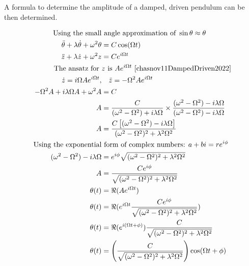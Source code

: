\documentclass[letterpaper, 12pt]{article}
\begin{document}
A formula to determine the amplitude of a damped, driven pendulum
can be then determined.

\begingroup
\allowdisplaybreaks
\begin{align*}
    \text{Using the small}                           & \text{ angle approximation of }    \sin\theta \approx \theta
    \\
    \ddot\theta + \lambda\dot\theta + \omega^2\theta & = C\cos(\Omega t)
    \\
    \ddot z + \lambda\dot z + \omega^2 z             & = Ce^{i\Omega t}
    \\
    \text{The ansatz for }                           & z \text{ is } Ae^{i\Omega t} ~\text{\cite{chasnov11DampedDriven2022}}
    \\
    \dot z = i\Omega Ae^{i\Omega t},                 & \quad \ddot z = -\Omega^2 Ae^{i\Omega t}
    \\
    -\Omega^2 A + i\lambda\Omega A + \omega^2 A      & = C
    \\
    A                                                & = \frac{C}{(\omega^2 - \Omega^2) + i\lambda\Omega} \times \frac{(\omega^2 - \Omega^2) - i\lambda\Omega}{(\omega^2 - \Omega^2) - i\lambda\Omega}
    \\
    A                                                & = \frac{C\left[ (\omega^2 - \Omega^2) - i\lambda\Omega \right]}{(\omega^2 - \Omega^2)^2 + \lambda^2\Omega^2}
    \\
    \text{Using the exponential}                     & \text{ form of complex numbers: } a + bi = re^{i\phi}
    \\
    (\omega^2 - \Omega^2) - i\lambda\Omega           & = e^{i\phi} \sqrt{(\omega^2 - \Omega^2)^2 + \lambda^2\Omega^2}
    \\
    A                                                & = \frac{Ce^{i\phi}}{\sqrt{(\omega^2 - \Omega^2)^2 + \lambda^2\Omega^2}}
    \\
    \theta (t)                                       & = \Re (Ae^{i\Omega t})
    \\
    \theta (t)                                       & = \Re (e^{i\Omega t} \frac{Ce^{i\phi}}{\sqrt{(\omega^2 - \Omega^2)^2 + \lambda^2\Omega^2}})
    \\
    \theta (t)                                       & = \Re (e^{i(\Omega t + \phi)}) \frac{C}{\sqrt{(\omega^2 - \Omega^2)^2 + \lambda^2\Omega^2}}
    \\
    \theta (t)                                       & = \left(\frac{C}{\sqrt{(\omega^2 - \Omega^2)^2 + \lambda^2\Omega^2}}\right) \cos(\Omega t + \phi)
\end{align*}
\endgroup
\end{document}
